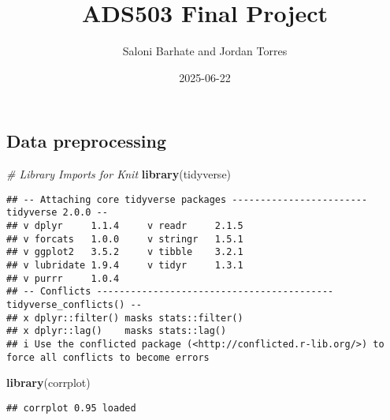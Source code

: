 \documentclass[
]{article}
\title{ADS503 Final Project}
\author{Saloni Barhate and Jordan Torres}
\date{2025-06-22}
\newenvironment{Shaded}{\begin{snugshade}}{\end{snugshade}}
\newcommand{\CommentTok}[1]{\textcolor[rgb]{0.56,0.35,0.01}{\textit{#1}}}
\newcommand{\FunctionTok}[1]{\textcolor[rgb]{0.13,0.29,0.53}{\textbf{#1}}}
\newcommand{\NormalTok}[1]{#1}
\begin{document}
\maketitle

\subsection{Data preprocessing}\label{data-preprocessing}

\begin{Shaded}
\begin{Highlighting}[]
\CommentTok{\# Library Imports for Knit }
\FunctionTok{library}\NormalTok{(tidyverse)}
\end{Highlighting}
\end{Shaded}

\begin{verbatim}
## -- Attaching core tidyverse packages ------------------------ tidyverse 2.0.0 --
## v dplyr     1.1.4     v readr     2.1.5
## v forcats   1.0.0     v stringr   1.5.1
## v ggplot2   3.5.2     v tibble    3.2.1
## v lubridate 1.9.4     v tidyr     1.3.1
## v purrr     1.0.4     
## -- Conflicts ------------------------------------------ tidyverse_conflicts() --
## x dplyr::filter() masks stats::filter()
## x dplyr::lag()    masks stats::lag()
## i Use the conflicted package (<http://conflicted.r-lib.org/>) to force all conflicts to become errors
\end{verbatim}

\begin{Shaded}
\begin{Highlighting}[]
\FunctionTok{library}\NormalTok{(corrplot)}
\end{Highlighting}
\end{Shaded}

\begin{verbatim}
## corrplot 0.95 loaded
\end{verbatim}
\end{document}
